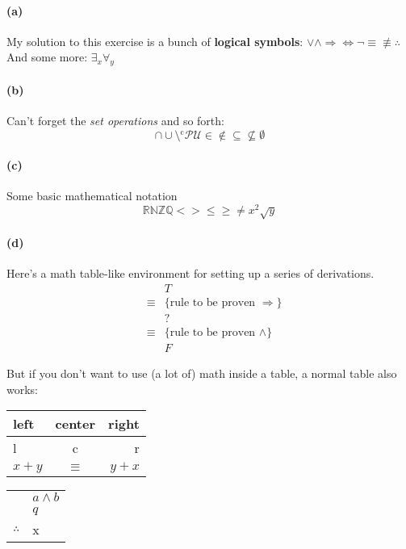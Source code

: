 \documentclass[a4paper,twoside,11pt]{article}
\newcommand{\R}{{\mathbb R}}
\newcommand{\N}{{\mathbb N}}
\newcommand{\Z}{{\mathbb Z}}
\newcommand{\Q}{{\mathbb Q}}
\begin{document}
\newpage
\paragraph{(a)} 
My solution to this exercise is a bunch of \textbf{logical symbols}:
$\vee \wedge \Rightarrow \Leftrightarrow \neg \equiv \not\equiv \therefore$\\
And some more: $\exists_x \forall_y$

\paragraph{(b)}
Can't forget the \emph{set operations} and so forth:
\[ \cap \cup \setminus {}^\text{c} \mathcal{P} \mathcal{U} \in \not\in \subseteq \not\subseteq \emptyset \]

\paragraph{(c)}
Some basic mathematical notation
\[ \R \N \Z \Q < > \leq \geq \neq x^2 \sqrt{y} \]

\paragraph{(d)}

Here's a math table-like environment for setting up a series of derivations.
\begin{eqnarray*}
  && T \\
  &\equiv& \{ \text{rule to be proven } \Rightarrow \} \\
  && ? \\
  &\equiv& \{ \text{rule to be proven } \wedge \} \\
  && F 
\end{eqnarray*}

But if you don't want to use (a lot of) math inside a table, a normal table also works:\\
\begin{tabular}{lcr}
left & center & right \\
\hline
l & c & r \\
$x+y$ & $\equiv$ & $y + x$ \\
\end{tabular}

\begin{tabular}{rl}
& $a \wedge b$ \\
& $q$ \\
\hline
$\therefore$ & x 
\end{tabular}
\end{document}

